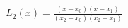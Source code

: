 \documentclass[preview]{standalone}
\begin{document}
\begin{align*}
L_2(x) = \frac{(x - x_0)(x - x_1)}{(x_2 - x_0)(x_2 - x_1)}
\end{align*}
\end{document}
